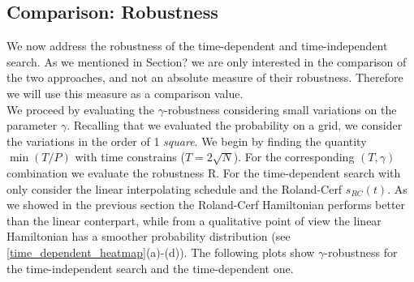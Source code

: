         \clearpage
    \subsection{Comparison: Robustness}
    We now address the robustness of the time-dependent and time-independent search. As we mentioned in Section? we are only interested in the comparison of the two approaches, and not an absolute measure of their robustness. Therefore we will use this measure as a comparison value. \\
    We proceed by evaluating the $\gamma$-robustness considering small variations on the parameter $\gamma$. Recalling that we evaluated the probability on a grid, we consider the variations in the order of 1 \textit{square}. We begin by finding the quantity $\min(T/P)$ with time constrains ($T = 2\sqrt{N}$). For the corresponding $(T,\gamma)$ combination we evaluate the robustness R.
    For the time-dependent search with only consider the linear interpolating schedule and the Roland-Cerf $s_{RC}(t)$. As we showed in the previous section the Roland-Cerf Hamiltonian performs better than the linear conterpart, while from a qualitative point of view the linear Hamiltonian has a smoother probability distribution (see \cref{time_dependent_heatmap}(a)-(d)). The following plots show $\gamma$-robustness for the time-independent search and the time-dependent one.

    
